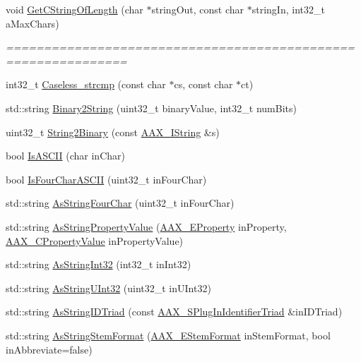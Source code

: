 \begin{DoxyCompactItemize}
\item 
void \hyperlink{a00288_aa3db8a743884054a6ac1ec2c2495e86f}{Get\+C\+String\+Of\+Length} (char $\ast$string\+Out, const char $\ast$string\+In, int32\+\_\+t a\+Max\+Chars)
\begin{DoxyCompactList}\small\item\em ============================================================== \end{DoxyCompactList}\item 
int32\+\_\+t \hyperlink{a00288_a5f092aff54cbd222fda57f5ea0a12189}{Caseless\+\_\+strcmp} (const char $\ast$cs, const char $\ast$ct)
\item 
std\+::string \hyperlink{a00288_a690ffc499da04ea963fff3bf8d6174fb}{Binary2\+String} (uint32\+\_\+t binary\+Value, int32\+\_\+t num\+Bits)
\item 
uint32\+\_\+t \hyperlink{a00288_a7b02e5d4a96f72213f0d1e4b52e13050}{String2\+Binary} (const \hyperlink{a00113}{A\+A\+X\+\_\+\+I\+String} \&s)
\item 
bool \hyperlink{a00288_aa8ebc6a8ee1232c4ffec828bff3c2998}{Is\+A\+S\+C\+I\+I} (char in\+Char)
\item 
bool \hyperlink{a00288_a00fbf59b268ca75214b2dad68be8ff77}{Is\+Four\+Char\+A\+S\+C\+I\+I} (uint32\+\_\+t in\+Four\+Char)
\item 
std\+::string \hyperlink{a00288_a22eda3cc42cb4ea2192b00bab7a69b02}{As\+String\+Four\+Char} (uint32\+\_\+t in\+Four\+Char)
\item 
std\+::string \hyperlink{a00288_a1b3d4b5a967f01922963876447644b15}{As\+String\+Property\+Value} (\hyperlink{a00283_a6571f4e41a5dd06e4067249228e2249e}{A\+A\+X\+\_\+\+E\+Property} in\+Property, \hyperlink{a00149_ab247c0d8686c14e05cbb567ef276f249}{A\+A\+X\+\_\+\+C\+Property\+Value} in\+Property\+Value)
\item 
std\+::string \hyperlink{a00288_ab024a3d9ac9c68350b377b2c70ec4727}{As\+String\+Int32} (int32\+\_\+t in\+Int32)
\item 
std\+::string \hyperlink{a00288_ada4fd7cb0e04582a7615a76f6be7e404}{As\+String\+U\+Int32} (uint32\+\_\+t in\+U\+Int32)
\item 
std\+::string \hyperlink{a00288_a89e00fcb44e30c443bebba0f026ef62a}{As\+String\+I\+D\+Triad} (const \hyperlink{a00127}{A\+A\+X\+\_\+\+S\+Plug\+In\+Identifier\+Triad} \&in\+I\+D\+Triad)
\item 
std\+::string \hyperlink{a00288_a34d219233eb5c9836b837fa2a67150d1}{As\+String\+Stem\+Format} (\hyperlink{a00206_ad8af5ef008b2bd478add9a0acb0a1d85}{A\+A\+X\+\_\+\+E\+Stem\+Format} in\+Stem\+Format, bool in\+Abbreviate=false)

\end{DoxyCompactItemize}

